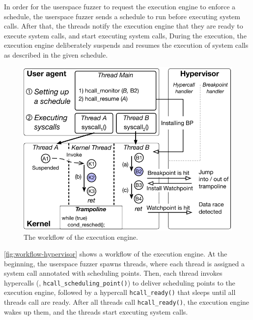 %


%
In order for the userspace fuzzer to request the execution engine to
enforce a schedule, the userspace fuzzer sends a schedule to run
before executing system calls.
%
After that, the threads notify the execution engine that they are
ready to execute system calls, and start executing system calls,
%
During the execution, the execution engine deliberately suspends and
resumes the execution of system calls as described in the given
schedule.

%
\begin{figure}[t]
  \centering
  \includegraphics[width=0.9\linewidth]{fig/workflow-hypervisor.pdf}
  \caption{The workflow of the execution engine. }
  \label{fig:workflow-hypervisor}
\end{figure}
%
\autoref{fig:workflow-hypervisor} shows a workflow of the execution
engine.
%
At the beginning, the userspace fuzzer spawns threads, where each
thread is assigned a system call annotated with scheduling points.
%
Then, each thread invokes hypercalls (\ie,
\texttt{hcall_scheduling_point()}) to deliver scheduling points to the
execution engine, followed by a hypercall \texttt{hcall_ready()} that
sleeps until all threads call are ready.
%
After all threads call \texttt{hcall_ready()}, the execution engine
wakes up them, and the threads start executing system calls.


